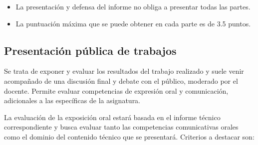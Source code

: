 \documentclass[a4paper, 11pt]{article}
\begin{document}
\begin{importantbox}
\begin{itemize} \small

\item La presentación y defensa del informe no obliga a presentar todas las partes.
\item La puntuación máxima que se puede obtener en cada parte es de 3.5 puntos.
\end{itemize}
\end{importantbox}


\subsection{Presentación pública de trabajos} \label{subsec:presentacion}

Se trata de exponer y evaluar los resultados del trabajo realizado y suele venir acompañado de una discusión final y debate con el público, moderado por el docente. Permite evaluar competencias de expresión oral y comunicación, adicionales a las específicas de la asignatura.

La evaluación de la exposición oral estará basada en el informe técnico correspondiente y busca evaluar tanto las competencias comunicativas orales como el dominio del contenido técnico que se presentará. Criterios a destacar son:
\end{document}
